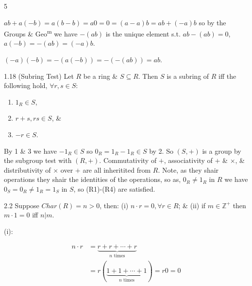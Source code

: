 \documentclass[8pt]{extarticle}
\makeatletter
\renewenvironment{proof}[1][\proofname]{%
  \par%
  \pushQED{\qed}%
  \normalfont
  \topsep=2pt\partopsep=0pt\parsep=0pt\itemsep=0pt%
  \trivlist
  \item[\hskip\labelsep\itshape #1\@addpunct{.}]\ignorespaces
}{%
  \popQED\endtrivlist\@endpefalse
  \vspace{-1pt}%
}
\makeatother
\begin{document}
\begin{multicols}{5}
\begin{proof}
            \(ab+a(-b)=a(b-b)=a0=0=(a-a)b=ab+(-a)b\) so by the Groups \& Geo\textsuperscript{m} we have \(-(ab)\) is the unique element s.t. \(ab-(ab)=0\), \(a(-b)=-(ab)=(-a)b\).

            \((-a)(-b)=-(a(-b))=-(-(ab))=ab\).
        \end{proof}

        \begin{lemma}{1.18}
            (Subring Test) Let \(R\) be a ring \& \(S\subseteq R\). Then \(S\) is a subring of \(R\) iff the following hold, \(\forall r,s\in S\):

            \vspace{-10pt}
            \begin{enumerate}
                \item \(1_R\in S\),
                \vspace{-10pt}
                \item \(r+s,rs\in S\), \& 
                \vspace{-10pt}
                \item \(-r\in S\).
            \end{enumerate}
            \vspace{-10pt}
        \end{lemma}

        \begin{proof}
            By 1 \& 3 we have \(-1_R\in S\) so \(0_R=1_R-1_R\in S\) by 2. So \((S,+)\) is a group by the subgroup test with \((R,+)\).
            Commutativity of \(+\), associativity of \(+\) \& \(\times\), \& distributivity of \(\times\) over \(+\) are all inheritited from \(R\).
            Note, as they shair operations they shair the identities of the operations, so as, \(0_R\ne1_R\) in \(R\) we have \(0_S=0_R\ne 1_R=1_S\) in \(S\), so (R1)-(R4) are satisfied.
        \end{proof}

        \begin{lemma}{2.2}
            Suppose \(Char(R)=n>0\), then: (i) \(n\cdot r=0, \forall r\in R\); \& (ii) if \(m\in\mathbb{Z}^+\) then \(m\cdot 1=0\) iff \(n|m\).
        \end{lemma}
        

        \begin{proof}
            (i):

            \vspace{-15pt}
            \begin{align*}
                n\cdot r&=\underbrace{r+r+\cdots+r}_{n\text{ times}}\\
                &=r(\underbrace{1+1+\cdots+1}_{n\text{ times}})=r0=0
            \end{align*}
            \vspace{-10pt}


\end{proof}
\end{multicols}
\end{document}
